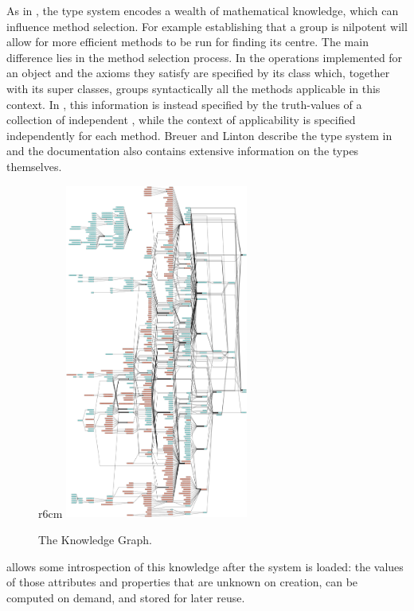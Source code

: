 As in \Sage, the \GAP type system encodes a wealth of mathematical
knowledge, which can influence method selection. For example
establishing that a group is nilpotent will allow for more efficient
methods to be run for finding its centre. The main difference lies in
the method selection process. In \Sage the operations
implemented for an object and the axioms they satisfy are specified by
its class which, together with its super classes, groups syntactically
all the methods applicable in this context. In \GAP, this information
is instead specified by the truth-values of a collection of
independent , while the context of applicability is
specified independently for each method.
%
Breuer and Linton describe the \GAP type system in \cite{breuer-linton} and
the \GAP documentation \cite{GAP4} also contains extensive information on the types
themselves.

\begin{figure}r{6cm}\vspace*{-2em}
  \includegraphics[width=6cm]{gap-graph}\vspace*{-.5em}
  \caption{The \GAP Knowledge Graph.\label{fig:gap-graph}}\vspace*{-2em}
\end{figure}
\GAP allows some introspection of this knowledge after the system is loaded: the values of
those attributes and properties that are unknown on creation, can be computed on demand, and stored for later reuse.%

